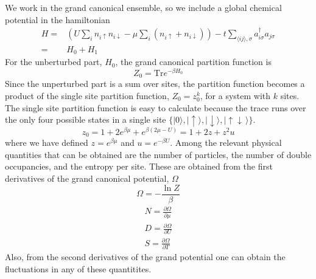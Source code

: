 \documentclass[11pt,letter]{article}
\newcommand{\dbl}{\ensuremath{ \uparrow\! \downarrow \, }}
\newcommand{\spup}{\ensuremath{ \uparrow }}
\newcommand{\spdn}{\ensuremath{ \downarrow}}
\begin{document}
We work in the grand canonical ensemble, so we include a global chemical potential
in the hamiltonian
\begin{equation}
\begin{split}
  H = &  
         \left( U\sum_{i} n_{i\spup} n_{i\spdn}  
         - \mu\sum_{i}( n_{i\spup} + n_{i\spdn} ) \right)
-t \sum_{ \langle ij \rangle, \sigma   } 
          a_{i\sigma}^{\dagger}a_{j\sigma} \\
   = &  H_{0} + H_{1} 
\end{split}
\end{equation}
For the unberturbed part, $H_{0}$, the grand canonical partition function is 
\begin{equation}
 Z_{0} = \text{Tr} e^{-\beta H_{0}} 
\end{equation}
Since the unperturbed part is a sum over sites, the partition function becomes
a product of the single site partition function, $Z_{0} = z_{0}^{k}$, for a
system with $k$ sites.  The single site partition function  is easy to
calculate because the trace runs over the only four possible states in a single
site $\lbrace |0\rangle, |\spup\rangle, |\spdn\rangle, |\dbl\rangle\rbrace$.
\begin{equation}
 z_{0} = 1 + 2 e^{\beta\mu} + e^{\beta (2\mu-U)} = 1 + 2z + z^{2}u 
\end{equation}
where we have defined $z=e^{\beta\mu}$ and $u=e^{-\beta U }$.  Among the
relevant physical quantities that can be obtained are the number of particles,
the number of double occupancies, and the entropy per site.  These are obtained
from the first derivatives of the grand canonical potential, $\Omega$
\begin{equation}
  \Omega = - \frac{\ln Z}{\beta}
\end{equation}
\begin{gather}
  N = \frac{\partial \Omega}{ \partial \mu } \\
  D = \frac{\partial \Omega}{ \partial U } \\
  S = \frac{\partial \Omega}{ \partial T} 
\end{gather}
Also, from the second derivatives of the grand potential one can obtain the
fluctuations in any of these quantitites. 
\end{document}
